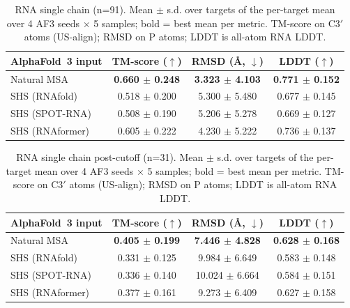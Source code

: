 \begin{table}[htbp]
\centering
\caption{RNA single chain (n=91). Mean $\pm$ s.d. over targets of the per-target mean over 4 AF3 seeds $\times$ 5 samples; bold = best mean per metric. TM-score on C3$'$ atoms (US-align); RMSD on P atoms; LDDT is all-atom RNA LDDT.}
\label{tab:rna_single_chain}
\begin{tabular}{lccc}
\toprule
AlphaFold~3 input & TM-score ($\uparrow$) & RMSD (\AA, $\downarrow$) & LDDT ($\uparrow$) \\
\midrule
Natural MSA & \textbf{0.660 $\pm$ 0.248} & \textbf{3.323 $\pm$ 4.103} & \textbf{0.771 $\pm$ 0.152} \\
SHS (RNAfold) & 0.518 $\pm$ 0.200 & 5.300 $\pm$ 5.480 & 0.677 $\pm$ 0.145 \\
SHS (SPOT-RNA) & 0.508 $\pm$ 0.190 & 5.206 $\pm$ 5.278 & 0.669 $\pm$ 0.127 \\
SHS (RNAformer) & 0.605 $\pm$ 0.222 & 4.230 $\pm$ 5.222 & 0.736 $\pm$ 0.137 \\
\bottomrule
\end{tabular}
\end{table}

\begin{table}[htbp]
\centering
\caption{RNA single chain post-cutoff (n=31). Mean $\pm$ s.d. over targets of the per-target mean over 4 AF3 seeds $\times$ 5 samples; bold = best mean per metric. TM-score on C3$'$ atoms (US-align); RMSD on P atoms; LDDT is all-atom RNA LDDT.}
\label{tab:rna_single_chain_post_cutoff}
\begin{tabular}{lccc}
\toprule
AlphaFold~3 input & TM-score ($\uparrow$) & RMSD (\AA, $\downarrow$) & LDDT ($\uparrow$) \\
\midrule
Natural MSA & \textbf{0.405 $\pm$ 0.199} & \textbf{7.446 $\pm$ 4.828} & \textbf{0.628 $\pm$ 0.168} \\
SHS (RNAfold) & 0.331 $\pm$ 0.125 & 9.984 $\pm$ 6.649 & 0.583 $\pm$ 0.148 \\
SHS (SPOT-RNA) & 0.336 $\pm$ 0.140 & 10.024 $\pm$ 6.664 & 0.584 $\pm$ 0.151 \\
SHS (RNAformer) & 0.377 $\pm$ 0.161 & 9.273 $\pm$ 6.409 & 0.627 $\pm$ 0.158 \\
\bottomrule
\end{tabular}
\end{table}

